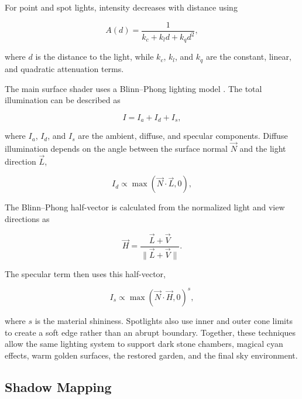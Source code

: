 \documentclass[11pt,a4paper]{article}
\begin{document}
For point and spot lights, intensity decreases with distance using

\begin{equation}
    A(d)
    =
    \frac{1}{k_c+k_l d+k_qd^2},
\end{equation}

where $d$ is the distance to the light, while $k_c$, $k_l$, and $k_q$ are the
constant, linear, and quadratic attenuation terms.

The main surface shader uses a Blinn--Phong lighting model \cite{learnopengl}.
The total illumination can be described as

\begin{equation}
    I = I_a + I_d + I_s ,
\end{equation}

where $I_a$, $I_d$, and $I_s$ are the ambient, diffuse, and specular
components. Diffuse illumination depends on the angle between the surface
normal $\vec{N}$ and the light direction $\vec{L}$,

\begin{equation}
    I_d \propto \max(\vec{N}\cdot\vec{L},0),
\end{equation}

The Blinn--Phong half-vector is calculated from the normalized light and view
directions as

\begin{equation}
    \vec{H}
    =
    \frac{\vec{L}+\vec{V}}
    {\|\vec{L}+\vec{V}\|}.
\end{equation}

The specular term then uses this half-vector,

\begin{equation}
    I_s \propto
    \max(\vec{N}\cdot\vec{H},0)^{s},
\end{equation}

where $s$ is the material shininess. Spotlights also use inner and outer cone
limits to create a soft edge rather than an abrupt boundary. Together, these
techniques allow the same lighting system to support dark stone chambers,
magical cyan effects, warm golden surfaces, the restored garden, and the final
sky environment.


\subsection{Shadow Mapping}
\end{document}
